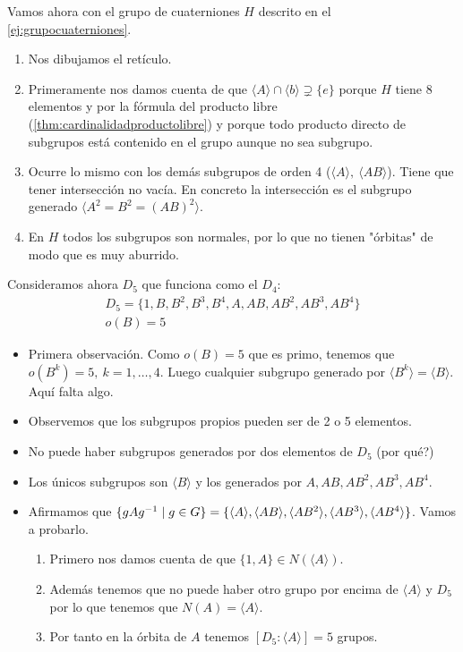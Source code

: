 \begin{ej}
	Vamos ahora con el grupo de cuaterniones $H$ descrito en el \autoref{ej:grupocuaterniones}.
	
	
	
	\begin{enumerate}
		\item Nos dibujamos el retículo.
		\item Primeramente nos damos cuenta de que $\langle A \rangle \cap \langle b \rangle \supsetneq \{e\}$ porque $H$ tiene 8 elementos y por la fórmula del producto libre (\autoref{thm:cardinalidadproductolibre}) y porque todo producto directo de subgrupos está contenido en el grupo aunque no sea subgrupo.
		\item Ocurre lo mismo con los demás subgrupos de orden 4 ($\langle A \rangle,\ \langle AB \rangle$). Tiene que tener intersección no vacía. En concreto la intersección es el subgrupo generado $\langle A^2 = B^2 = (AB)^2 \rangle$.
		\item En $H$ todos los subgrupos son normales, por lo que no tienen "órbitas" de modo que es muy aburrido.
	\end{enumerate}
\end{ej}

\begin{ej}
	Consideramos ahora $D_5$ que funciona como el $D_4$:
	\begin{align*}
	D_5 = \{1, B, B^2, B^3, B^4, A, AB, AB^2, AB^3, AB^4\} \\
	o(B) = 5
	\end{align*}
	\begin{itemize}
		\item Primera observación. Como $o(B) = 5$ que es primo, tenemos que $o(B^k) = 5,\ k = 1, \dots, 4$. Luego cualquier subgrupo generado por $\langle B^k \rangle = \langle B \rangle$. Aquí falta algo.
		\item Observemos que los subgrupos propios pueden ser de 2 o 5 elementos.
		\item No puede haber subgrupos generados por dos elementos de $D_5$ (por qué?)
		\item Los únicos subgrupos son $\langle B \rangle$ y los generados por $A, AB, AB^2, AB^3, AB^4$.
		\item Afirmamos que $\{gAg^{-1} \mid g \in G\} = \{\langle A \rangle, \langle AB \rangle, \langle AB^2 \rangle, \langle AB^3 \rangle, \langle AB^4 \rangle \}$. Vamos a probarlo.
		
		\begin{enumerate}
			\item Primero nos damos cuenta de que $\{1, A\} \in N(\langle A \rangle)$.
			\item Además tenemos que no puede haber otro grupo por encima de $\langle A \rangle$ y $D_5$ por lo que tenemos que $N(A) = \langle A \rangle$.
			\item Por tanto en la órbita de $A$ tenemos $[D_5:\langle A \rangle] = 5$ grupos.
		\end{enumerate}
		
	\end{itemize}
\end{ej}

